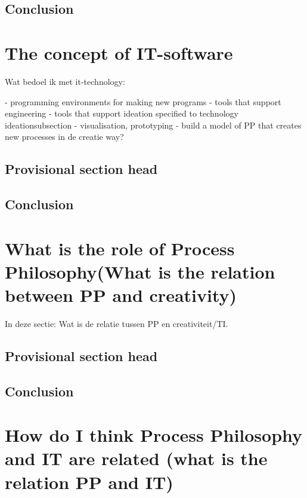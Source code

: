 \documentclass[a4paper]{Thesis}
\begin{document}
\section{Conclusion}

\chapter{The concept of IT-software}
Wat bedoel ik met it-technology:

- programming environments for making new programs
- tools that support engineering
- tools that support ideation specified to technology ideationsubsection{}
- visualisation, prototyping
- build a model of PP that creates new processes in de creatie way?

\section{Provisional section head}
\section{Conclusion}

\chapter{What is the role of Process Philosophy(What is the relation between PP and creativity)}

In deze sectie: Wat is de relatie tussen PP en creativiteit/TI.

\section{Provisional section head}
\section{Conclusion}

\chapter{How do I think Process Philosophy and IT are related (what is the relation PP and IT)}
\end{document}
